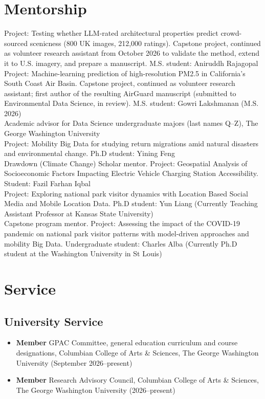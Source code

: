 \documentclass[11pt, a4paper]{article}
\newcommand{\years}[1]{\marginnote{\scriptsize #1}}
\begin{document}
\section*{Mentorship}
\years{2026} Project: Testing whether LLM-rated architectural properties predict crowd-sourced scenicness (800 UK images, 212,000 ratings). Capstone project, continued as volunteer research assistant from October 2026 to validate the method, extend it to U.S. imagery, and prepare a manuscript. M.S. student: Aniruddh Rajagopal\\
\years{2026} Project: Machine-learning prediction of high-resolution PM2.5 in California’s South Coast Air Basin. Capstone project, continued as volunteer research assistant; first author of the resulting AirGuard manuscript (submitted to Environmental Data Science, in review). M.S. student: Gowri Lakshmanan (M.S. 2026)\\
\years{2025-} Academic advisor for Data Science undergraduate majors (last names Q--Z), The George Washington University\\
\years{2023} Project: Mobility Big Data for studying return migrations amid natural disasters and environmental change. Ph.D student: Yining Feng\\
\years{2023} Drawdown (Climate Change) Scholar mentor. Project: Geospatial Analysis of Socioeconomic Factors Impacting Electric Vehicle Charging Station Accessibility. Student: Fazil Farhan Iqbal\\
\years{2022} Project: Exploring national park visitor dynamics with Location Based Social Media and Mobile Location Data. Ph.D student: Yun Liang (Currently Teaching Assistant Professor at Kansas State University)\\
\years{2021} Capstone program mentor. Project: Assessing the impact of the COVID-19 pandemic on national park visitor patterns with model-driven approaches and mobility Big Data. Undergraduate student: Charles Alba (Currently Ph.D student at the Washington University in St Louis)\\


\section*{Service}
\subsection*{University Service}
\begin{itemize}
\item{\textbf{Member} GPAC Committee, general education curriculum and course designations, Columbian College of Arts \& Sciences, The George Washington University (September 2026--present)}
\item{\textbf{Member} Research Advisory Council, Columbian College of Arts \& Sciences, The George Washington University (2026--present)}
\end{itemize}
\end{document}
